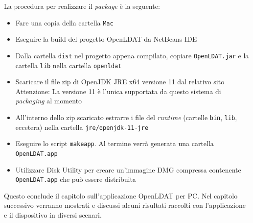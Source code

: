 La procedura per realizzare il \textit{package} è la seguente:\begin{itemize}
	\item Fare una copia della cartella \texttt{Mac}
	\item Eseguire la build del progetto OpenLDAT da NetBeans IDE
	\item Dalla cartella \texttt{dist} nel progetto appena compilato, copiare \texttt{OpenLDAT.jar} e la cartella \texttt{lib} nella cartella \texttt{openldat}
	\item Scaricare il file zip di OpenJDK JRE x64 versione 11 dal relativo sito\\
	Attenzione: La versione 11 è l'unica supportata da questo sistema di \textit{packaging} al momento
	\item All'interno dello zip scaricato estrarre i file del \textit{runtime} (cartelle \texttt{bin}, \texttt{lib}, eccetera) nella cartella \texttt{jre/openjdk-11-jre}
	\item Eseguire lo script \texttt{makeapp}. Al termine verrà generata una cartella \texttt{OpenLDAT.app}
	\item Utilizzare Disk Utility per creare un'immagine DMG compressa contenente \texttt{OpenLDAT.app} che può essere distribuita
\end{itemize}

Questo conclude il capitolo sull'applicazione OpenLDAT per PC. Nel capitolo successivo verranno mostrati e discussi alcuni risultati raccolti con l'applicazione e il dispositivo in diversi scenari.
